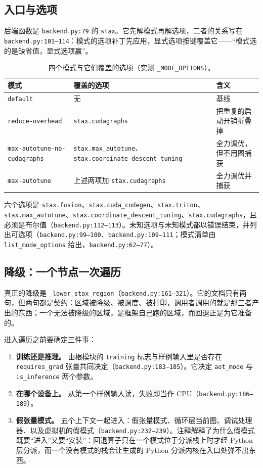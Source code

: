 \subsection{入口与选项}

后端函数是 \texttt{backend.py:79} 的 \texttt{stax}。它先解模式再解选项，二者的关系写在 \texttt{backend.py:101--114}：模式的选项补丁先应用，显式选项按键覆盖它——“模式选的是缺省值，显式选项赢”。

\begin{table}[H]
\centering
\caption{四个模式与它们覆盖的选项（实测 \texttt{\_MODE\_OPTIONS}）。}
\label{tab:be:modes}
\small
\begin{tabular}{lll}
\toprule
模式 & 覆盖的选项 & 含义 \\
\midrule
\texttt{default} & 无 & 基线 \\
\texttt{reduce-overhead} & \texttt{stax.cudagraphs} & 把重复的启动开销折叠掉 \\
\texttt{max-autotune-no-cudagraphs} & \texttt{stax.max\_autotune}、\texttt{stax.coordinate\_descent\_tuning} & 全力调优，但不用图捕获 \\
\texttt{max-autotune} & 上述两项加 \texttt{stax.cudagraphs} & 全力调优并捕获 \\
\bottomrule
\end{tabular}
\end{table}

六个选项是 \texttt{stax.fusion}、\texttt{stax.cuda\_codegen}、\texttt{stax.triton}、\texttt{stax.max\_autotune}、\texttt{stax.coordinate\_descent\_tuning}、\texttt{stax.cudagraphs}，且必须是布尔值（\texttt{backend.py:112--113}）。未知选项与未知模式都以错误结束，并列出可选项（\texttt{backend.py:99--100}、\texttt{backend.py:109--111}；模式清单由 \texttt{list\_mode\_options} 给出，\texttt{backend.py:62--77}）。

\subsection{降级：一个节点一次遍历}

真正的降级是 \texttt{\_lower\_stax\_region}（\texttt{backend.py:161--321}）。它的文档只有两句，但两句都是契约：区域被降级、被调度、被打印，调用者调用的就是那三者产出的东西；一个无法被降级的区域，是框架自己跑的区域，而回退正是为它准备的。

进入遍历之前要确定三件事：

\begin{enumerate}[nosep, leftmargin=1.2em]
\item \textbf{训练还是推理。} 由根模块的 \texttt{training} 标志与样例输入里是否存在 \texttt{requires\_grad} 张量共同决定（\texttt{backend.py:183--185}）。它决定 \texttt{aot\_mode} 与 \texttt{is\_inference} 两个参数。
\item \textbf{在哪个设备上。} 从第一个样例输入读，失败即当作 CPU（\texttt{backend.py:186--189}）。
\item \textbf{假张量模式。} 五个上下文一起进入：假张量模式、循环层当前图、调试处理器、以及虚拟机的假模式（\texttt{backend.py:232--239}）。注释解释了为什么假模式既要“进入”又要“安装”：回退算子只在一个模式位于分派栈上时才经 Python 层分派，而一个没有模式的栈会让生成的 Python 分派内核在入口处弹不出东西。
\end{enumerate}

